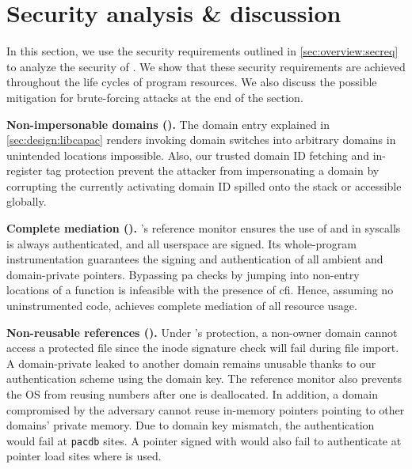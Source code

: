 \section{Security analysis \& discussion}
\label{sec:discussion}
In this section, we use the security requirements outlined in \cref{sec:overview:secreq} to analyze the security of \thename. 
We show that these security requirements are achieved throughout the life cycles of program resources.
We also discuss the possible mitigation for brute-forcing attacks at the end of the section.

\textbf{Non-impersonable domains (\srimper).}
The domain entry explained in \cref{sec:design:libcapac} renders invoking domain switches into arbitrary domains in unintended locations impossible. 
Also, our trusted domain ID fetching and in-register tag protection prevent the attacker from impersonating a domain by corrupting the currently activating domain ID spilled onto the stack or accessible globally.

\textbf{Complete mediation (\srcompmed).}
\thename's reference monitor ensures the use of \fd and \cpath in \glspl{syscall} is always authenticated, and all userspace \fds are signed.
Its whole-program instrumentation guarantees the signing and authentication of all ambient and domain-private pointers.
Bypassing \gls{pa} checks by jumping into non-entry locations of a function is infeasible with the presence of \gls{cfi}.
Hence, assuming no uninstrumented code, \thename achieves complete mediation of all resource usage.

\textbf{Non-reusable references (\srreuse).}
Under \thename's protection, a non-owner domain cannot access a protected file since the inode signature check will fail during file import.
A domain-private \fd leaked to another domain remains unusable thanks to our \fd authentication scheme using the domain key.
The reference monitor also prevents the OS from reusing \fd numbers after one is deallocated.
In addition, a domain compromised by the adversary cannot reuse in-memory pointers pointing to other domains' private memory.
Due to domain key mismatch, the authentication would fail at \texttt{pacdb} sites.
A pointer signed with  would also fail to authenticate at pointer 
load sites where  is used.


